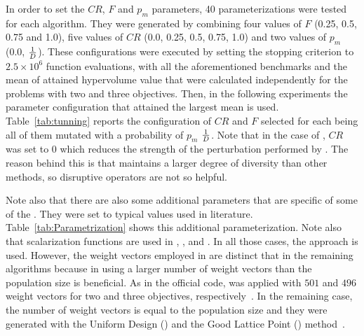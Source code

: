 In order to set the $CR$, $F$ and $p_m$ parameters, 40 parameterizations were tested for each algorithm.
%
They were generated by combining four values of $F$ (0.25, 0.5, 0.75 and 1.0), five values of $CR$ (0.0, 0.25, 0.5, 0.75, 1.0) 
and two values of $p_m$ (0.0, $1\over{D}$).
%
These configurations were executed by setting the stopping criterion to $2.5 \times 10^{6}$ function evaluations, 
with all the aforementioned benchmarks and the mean of attained hypervolume value that were calculated independently
for the problems with two and three objectives.
%
Then, in the following experiments the parameter configuration that attained the largest mean is used.
%
Table~\ref{tab:tunning} reports the configuration of $CR$ and $F$ selected for each \MOEA{} being all of them mutated with a probability of $p_m$ $1 \over{D}$.
%
Note that in the case of \AVSDMOEAD{}, $CR$ was set to 0 which reduces the strength of the perturbation performed
by \DE{}.
%
The reason behind this is that \AVSDMOEAD{} maintains a larger degree of diversity than other methods, so disruptive
operators are not so helpful.

Note also that there are also some additional parameters that are specific of some of the \MOEAS{}.
%
They were set to typical values used in literature. 
%
Table~\ref{tab:Parametrization} shows this additional parameterization.
%
Note also that scalarization functions are used in \MOEADDE{}, \RMOEA{}, \NSGAIII{} and \AVSDMOEAD{}.
%
In all those cases, the \ASF{} approach is used.
%
However, the weight vectors employed in \RMOEA{} are distinct that in the remaining algorithms because in \RMOEA{} using
a larger number of weight vectors than the population size is beneficial.
%
As in the official code, \RMOEA{} was applied with $501$ and $496$ weight vectors for two and three objectives, 
respectively~\cite{trautmann2013r2}.
%
In the remaining case, the number of weight vectors is equal to the population size and they were generated
with the Uniform Design (\UD{}) and the Good Lattice Point (\GLP{}) method~\cite{tan2013moea1, tan2013moea2}.
%




